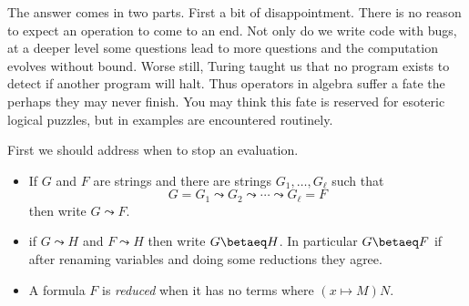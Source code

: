 The answer comes in two parts.  First a bit of disappointment.
There is no reason to expect an operation to come to an end.
Not only do we write code with bugs, at a deeper level some 
questions lead to more questions and the computation 
evolves without bound.  Worse still, Turing taught us that 
no program exists to detect if another program will halt.
Thus operators in algebra suffer a fate the perhaps they may 
never finish.  You may think this fate is reserved for esoteric 
logical puzzles, but in examples are encountered routinely.

First we should address when to stop an evaluation.
\begin{definition}
    \begin{itemize}
        \item If $G$ and $F$ are strings and there are strings 
        $G_1,\ldots,G_{\ell}$ such that 
        \[ G=G_1 \leadsto G_2 \leadsto\cdots\leadsto G_{\ell}=F\]
        then write $G\leadsto F$.

        \item if $G\leadsto H$ and $F\leadsto H$ then write $G\betaeq H$.
        In particular $G\betaeq F$ if after renaming variables and doing some reductions 
        they agree.

        \item A formula $F$ is \emph{reduced} when it has no terms where 
        $(x\mapsto M)N$.  
    
    \end{itemize}
    
\end{definition}

